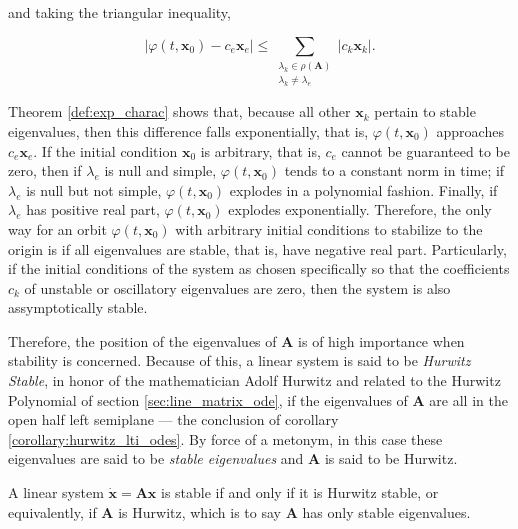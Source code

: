	\noindent and taking the triangular inequality,

\begin{equation} \left\lvert\varphi\left(t,\mathbf{x}_0\right) - c_e\mathbf{x}_e\right\rvert \leq \sum_{\substack{\lambda_k\in\rho\left(\mathbf{A}\right) \\ \lambda_k \neq \lambda_e} } \left\lvert c_k\mathbf{x}_k \right\rvert. \end{equation}

	Theorem \ref{def:exp_charac} shows that, because all other $\mathbf{x}_k$ pertain to stable eigenvalues, then this difference falls exponentially, that is, $\varphi\left(t,\mathbf{x}_0\right)$ approaches $c_e\mathbf{x}_e$. If the initial condition $\mathbf{x}_0$ is arbitrary, that is, $c_e$ cannot be guaranteed to be zero, then if $\lambda_e$ is null and simple, $\varphi\left(t,\mathbf{x}_0\right)$ tends to a constant norm in time; if $\lambda_e$ is null but not simple, $\varphi\left(t,\mathbf{x}_0\right)$ explodes in a polynomial fashion. Finally, if $\lambda_e$ has positive real part, $\varphi\left(t,\mathbf{x}_0\right)$ explodes exponentially. Therefore, the only way for an orbit $\varphi\left(t,\mathbf{x}_0\right)$ with arbitrary initial conditions to stabilize to the origin is if all eigenvalues are stable, that is, have negative real part. Particularly, if the initial conditions of the system as chosen specifically so that the coefficients $c_k$ of unstable or oscillatory eigenvalues are zero, then the system is also assymptotically stable.

	Therefore, the position of the eigenvalues of $\mathbf{A}$ is of high importance when stability is concerned. Because of this, a linear system is said to be \textit{Hurwitz Stable}, in honor of the mathematician Adolf Hurwitz and related to the Hurwitz Polynomial of section \ref{sec:line_matrix_ode}, if the eigenvalues of $\mathbf{A}$ are all in the open half left semiplane — the conclusion of corollary \ref{corollary:hurwitz_lti_odes}. By force of a metonym, in this case these eigenvalues are said to be \textit{stable eigenvalues} and $\mathbf{A}$ is said to be Hurwitz.

\begin{corollary} \label{corollary:hurwitz_lti_odes} %
	A linear system $\dot{\mathbf{x}} = \mathbf{Ax}$ is stable if and only if it is Hurwitz stable, or equivalently, if $\mathbf{A}$ is Hurwitz, which is to say $\mathbf{A}$ has only stable eigenvalues.
\end{corollary}

